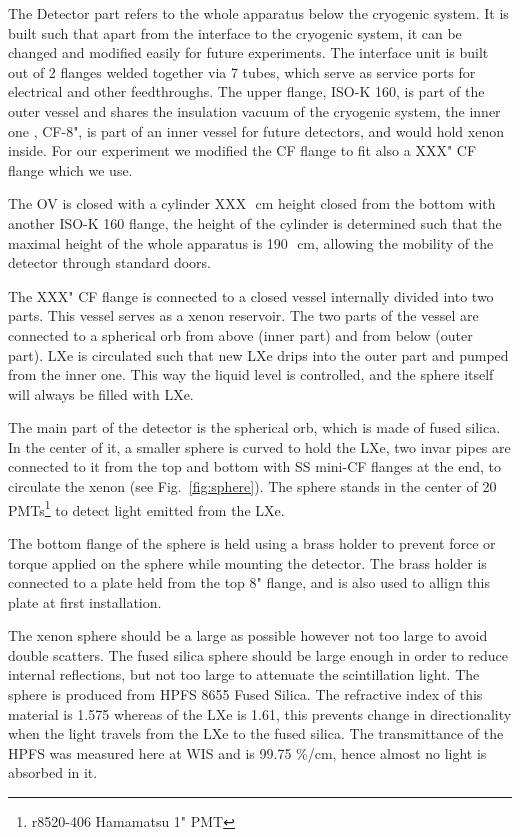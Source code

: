 The Detector part refers to the whole apparatus below the cryogenic system. It is built such that apart from the interface to the cryogenic system, it can be changed and modified easily for future experiments.
The interface unit is built out of 2 flanges welded together via 7 tubes, which serve as service ports for electrical and other feedthroughs. The upper flange, ISO-K 160, is part of the outer vessel and shares the insulation vacuum of the cryogenic system, the inner one , CF-8", is part of an inner vessel for future detectors, and would hold xenon inside. For our experiment we modified the CF flange to fit also a XXX" CF flange which we use.

The OV is closed with a cylinder XXX~\,cm height closed from the bottom with another ISO-K 160 flange, the height of the cylinder is determined such that the maximal height of the whole apparatus is 190~\,cm, allowing the mobility of the detector through standard doors.
 
The XXX" CF flange is connected to a closed vessel internally divided into two parts. This vessel serves as a xenon reservoir. The two parts of the vessel are connected to a spherical orb from above (inner part) and from below (outer part). LXe is circulated such that new LXe drips into the outer part and pumped from the inner one. This way the liquid level is controlled, and the sphere itself will always be filled with LXe. 

The main part of the detector is the spherical orb, which is made of fused silica. In the center of it, a smaller sphere is curved to hold the LXe, two invar pipes are connected to it from the top and bottom with SS mini-CF flanges at the end, to circulate the xenon (see Fig.~\ref{fig:sphere}). The sphere stands in the center of 20 PMTs\footnote{r8520-406 Hamamatsu 1" PMT} to detect light emitted from the LXe.

The bottom flange of the sphere is held using a brass holder to prevent force or torque applied on the sphere while mounting the detector. The brass holder is connected to a plate held from the top 8" flange, and is also used to allign this plate at first installation. 

The xenon sphere should be a large as possible however not too large to avoid double scatters. The fused silica sphere should be large enough in order to reduce internal reflections, but not too large to attenuate the scintillation light. The sphere is produced from HPFS 8655 Fused Silica. The refractive index of this material is 1.575 whereas of the LXe is 1.61, this prevents change in directionality when the light travels from the LXe to the fused silica. The transmittance of the HPFS was measured here at WIS and is 99.75 \%/cm, hence almost no light is absorbed in it.

